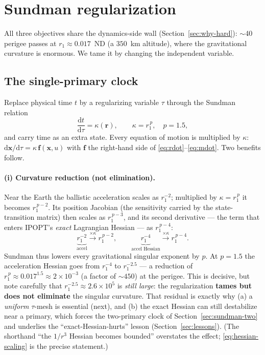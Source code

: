 \documentclass[11pt]{article}
\newcommand{\rv}{\mathbf{r}}
\newcommand{\dd}[2]{\frac{\mathrm{d}#1}{\mathrm{d}#2}}
\newcommand{\rE}{r_1}
\begin{document}
\section{Sundman regularization}\label{sec:sundman}
All three objectives share the dynamics-side wall (Section~\ref{sec:why-hard}):
$\sim$40 perigee passes at $\rE\approx0.017$~ND (a $350$~km altitude), where the
gravitational curvature is enormous. We tame it by changing the independent
variable.

\subsection{The single-primary clock}\label{sec:sundman-single}
Replace physical time $t$ by a regularizing variable $\tau$ through the Sundman
relation
\begin{equation}
  \dd{t}{\tau} = \kappa(\rv),\qquad \kappa = \rE^{\,p},\quad p=1.5,
  \label{eq:sundman}
\end{equation}
and carry time as an extra state. Every equation of motion is multiplied by
$\kappa$: $\mathrm{d}\mathbf{x}/\mathrm{d}\tau = \kappa\,\mathbf{f}(\mathbf{x},u)$
with $\mathbf{f}$ the right-hand side of \eqref{eq:rdot}--\eqref{eq:mdot}. Two
benefits follow.

\paragraph{(i) Curvature reduction (not elimination).} Near the Earth the
ballistic acceleration scales as $\rE^{-2}$; multiplied by $\kappa=\rE^{\,p}$ it
becomes $\rE^{\,p-2}$. Its position Jacobian (the sensitivity carried by the
state-transition matrix) then scales as $\rE^{\,p-3}$, and its second derivative
--- the term that enters IPOPT's \emph{exact} Lagrangian Hessian --- as
$\rE^{\,p-4}$:
\begin{equation}
  \underbrace{\rE^{-2}}_{\text{accel}} \xrightarrow{\times\kappa} \rE^{\,p-2},
  \qquad
  \underbrace{\rE^{-4}}_{\text{accel Hessian}} \xrightarrow{\times\kappa}
  \rE^{\,p-4}.
  \label{eq:hessian-scaling}
\end{equation}
Sundman thus lowers every gravitational singular exponent by $p$. At $p=1.5$ the
acceleration Hessian goes from $\rE^{-4}$ to $\rE^{-2.5}$ --- a reduction of
$\rE^{\,p}\approx 0.017^{1.5}\approx 2\times10^{-3}$ (a factor of $\sim\!450$) at
the perigee. This is decisive, but note carefully that $\rE^{-2.5}\approx
2.6\times10^{5}$ is \emph{still large}: the regularization \textbf{tames but does
not eliminate} the singular curvature. That residual is exactly why (a) a
\emph{uniform} $\tau$-mesh is essential (next), and (b) the exact Hessian can
still destabilize near a primary, which forces the two-primary clock of
Section~\ref{sec:sundman-two} and underlies the ``exact-Hessian-hurts'' lesson
(Section~\ref{sec:lessons}). (The shorthand ``the $1/r^3$ Hessian becomes
bounded'' overstates the effect; \eqref{eq:hessian-scaling} is the precise
statement.)
\end{document}
